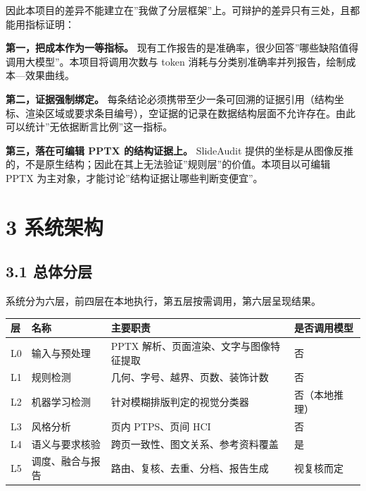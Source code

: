\documentclass[
  11pt,
]{article}
\newcounter{none} %
\begin{document}
因此本项目的差异不能建立在''我做了分层框架''上。可辩护的差异只有三处，且都能用指标证明：

\textbf{第一，把成本作为一等指标。}
现有工作报告的是准确率，很少回答''哪些缺陷值得调用大模型''。本项目将调用次数与
token 消耗与分类别准确率并列报告，绘制成本---效果曲线。

\textbf{第二，证据强制绑定。}
每条结论必须携带至少一条可回溯的证据引用（结构坐标、渲染区域或要求条目编号），空证据的记录在数据结构层面不允许存在。由此可以统计''无依据断言比例''这一指标。

\textbf{第三，落在可编辑 PPTX 的结构证据上。} SlideAudit
提供的坐标是从图像反推的，不是原生结构；因此在其上无法验证''规则层''的价值。本项目以可编辑
PPTX 为主对象，才能讨论''结构证据让哪些判断变便宜''。

\section{3 系统架构}\label{ux7cfbux7edfux67b6ux6784}

\subsection{3.1 总体分层}\label{ux603bux4f53ux5206ux5c42}

系统分为六层，前四层在本地执行，第五层按需调用，第六层呈现结果。


{\def\LTcaptype{none} %
\begin{longtable}[]{@{}
  >{\raggedright\arraybackslash}p{}
  >{\raggedright\arraybackslash}p{}
  >{\raggedright\arraybackslash}p{}
  >{\raggedright\arraybackslash}p{}@{}}
\toprule\noalign{}
\begin{minipage}[b]{\linewidth}\raggedright
层
\end{minipage} & \begin{minipage}[b]{\linewidth}\raggedright
名称
\end{minipage} & \begin{minipage}[b]{\linewidth}\raggedright
主要职责
\end{minipage} & \begin{minipage}[b]{\linewidth}\raggedright
是否调用模型
\end{minipage} \\
\midrule\noalign{}
\endhead
\bottomrule\noalign{}
\endlastfoot
L0 & 输入与预处理 & PPTX 解析、页面渲染、文字与图像特征提取 & 否 \\
L1 & 规则检测 & 几何、字号、越界、页数、装饰计数 & 否 \\
L2 & 机器学习检测 & 针对模糊排版判定的视觉分类器 & 否（本地推理） \\
L3 & 风格分析 & 页内 PTPS、页间 HCI & 否 \\
L4 & 语义与要求核验 & 跨页一致性、图文关系、参考资料覆盖 & 是 \\
L5 & 调度、融合与报告 & 路由、复核、去重、分档、报告生成 & 视复核而定 \\
\end{longtable}
}
\end{document}
